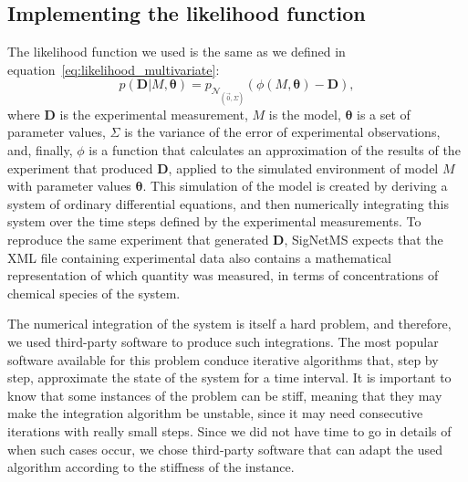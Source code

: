 \subsection{Implementing the likelihood function}
The likelihood function we used is the same as we defined in
equation~\ref{eq:likelihood_multivariate}:
\begin{equation*}
    p ({\bm D} | M,{\bm \theta}) = 
        p_{\mathcal{N}_{\left(\vec{0}, \Sigma\right)}}
        (\phi (M, {\bm\theta}) - {\bm D}),
\end{equation*}
where ${\bm D}$ is the experimental measurement, $M$ is the model,
${\bm \theta}$ is a set of parameter values, $\Sigma$ is the variance of
the error of experimental observations, and, finally, $\phi$ is a 
function that calculates an approximation of the results of the
experiment that produced ${\bm D}$, applied to the simulated environment
of model $M$ with parameter values ${\bm \theta}$. This simulation of
the model is created by deriving a system of ordinary differential
equations, and then numerically integrating this system over the time
steps defined by the experimental measurements. To reproduce the same
experiment that generated ${\bm D}$, SigNetMS expects that the XML file 
containing experimental data also contains a mathematical representation
of which quantity was measured, in terms of concentrations of chemical
species of the system.

The numerical integration of the system is itself a hard problem, and
therefore, we used third-party software to produce such integrations.
The most popular software available for this problem conduce
iterative algorithms that, step by step, approximate the state of the
system for a time interval. It is important to know that some instances
of the problem can be stiff, meaning that they may make the integration
algorithm be unstable, since it may need consecutive iterations with
really small steps. Since we did not have time to go in details of when 
such cases occur, we chose third-party software that can adapt the used
algorithm according to the stiffness of the instance.


